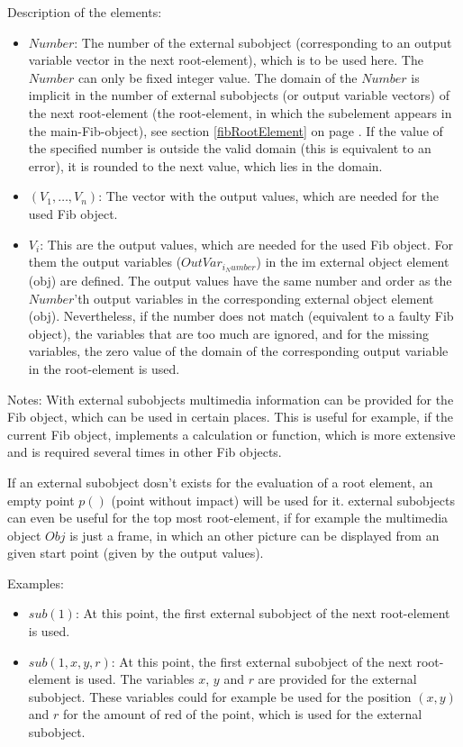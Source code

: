 \bigskip\noindent
Description of the elements:
\begin{itemize}
 \item $Number$: The number of the external subobject (corresponding to an output variable vector in the next root-element), which is to be used here. The $Number$ can only be fixed integer value. The domain of the $Number$ is implicit in the number of external subobjects (or output variable vectors) of the next root-element (the root-element, in which the subelement appears in the main-Fib-object), see section \ref{fibRootElement} on page \pageref{fibRootElement} . If the value of the specified number is outside the valid domain (this is equivalent to an error), it is rounded to the next value, which lies in the domain.
 \item $( V_1 , \ldots , V_n )$: The vector with the output values, which are needed for the used Fib object. 
 \item $V_i$: This are the output values, which are needed for the used Fib object. For them the output variables ($OutVar_{i_Number}$) in the im external object element (obj) are defined. The output values have the same number and order as the $Number$'th output variables in the corresponding external object element (obj).  Nevertheless, if the number does not match (equivalent to a faulty Fib object), the variables that are too much are ignored, and for the missing variables, the zero value of the domain of the corresponding output variable in the root-element is used.
\end{itemize}

\bigskip\noindent
Notes:
With external subobjects multimedia information can be provided for the Fib object, which can be used in certain places. This is useful for example, if the current Fib object, implements a calculation or function, which is more extensive and is required several times in other Fib objects.

If an external subobject dosn't exists for the evaluation of a root element, an empty point $p()$ (point without impact) will be used for it.
external subobjects can even be useful for the top most root-element, if for example the multimedia object $Obj$ is just a frame, in which an other picture can be displayed from an given start point (given by the output values).

\bigskip\noindent
Examples:
\begin{itemize}
 \item $sub( 1 )$: At this point, the first external subobject of the next root-element is used.
 \item $sub( 1, x, y, r )$: At this point, the first external subobject of the next root-element is used. The variables $x$, $y$ and $r$ are provided for the external subobject. These variables could for example be used for the position $(x, y)$ and $r$ for the amount of red of the point, which is used for the external subobject.
\end{itemize}

